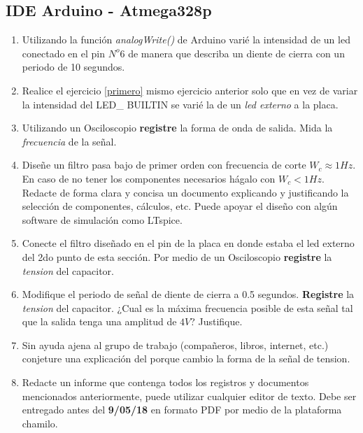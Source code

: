 \documentclass[10pt,conference,a4paper,onecolumn]{article}%
\begin{document}
\subsection{IDE Arduino - Atmega328p}
\begin{enumerate}
\item \label{primero} Utilizando la función \emph{analogWrite()} de Arduino varié la intensidad de un led conectado en el pin $N^o 6 $   de manera que describa un diente de cierra con un periodo de 10 segundos. 
\item Realice el ejercicio \ref{primero} mismo ejercicio anterior solo que en vez de variar la intensidad del LED\_ BUILTIN se varié la de un  \emph{led externo} a la placa.
\item Utilizando un Osciloscopio \textbf{registre} la forma de onda de salida. Mida la \emph{frecuencia} de la señal.  
\item Diseñe un filtro pasa bajo de primer orden con frecuencia de corte $W_c \approx 1Hz$. En caso de no tener los componentes necesarios hágalo con $W_c < 1Hz$. Redacte de forma clara y concisa un documento explicando y justificando la selección de componentes, cálculos, etc. Puede apoyar el diseño con algún software de simulación como LTspice.
\item Conecte el filtro diseñado en el pin de la placa en donde estaba el led externo del 2do punto de esta sección. Por medio de un Osciloscopio  \textbf{registre} la \emph{tension} del capacitor.
\item Modifique el periodo de señal de diente de cierra a 0.5 segundos. \textbf{Registre} la \emph{tension} del capacitor. ¿Cual es la máxima frecuencia posible de esta señal tal que la salida tenga una amplitud de $4V$? Justifique.
\item Sin ayuda ajena al grupo de trabajo (compañeros, libros, internet, etc.) conjeture una explicación del porque cambio la forma de la señal de tension. 
\item Redacte un informe que contenga todos los registros y documentos  mencionados anteriormente, puede utilizar cualquier editor de texto. Debe ser entregado antes del \textbf{9/05/18} en formato PDF por medio de la plataforma chamilo. 


\end{enumerate}
\end{document}
